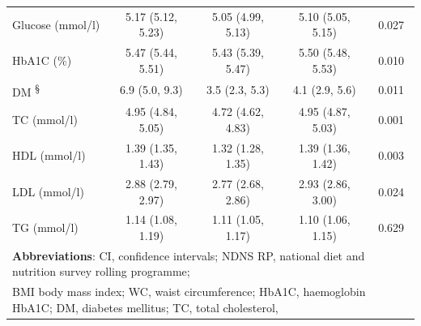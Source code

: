 \begin{table}[H]
\begin{tabular}[t]{lcccc}
		Glucose (mmol/l) & 5.17 (5.12, 5.23) & 5.05 (4.99, 5.13) & 5.10 (5.05, 5.15) & 0.027\\
		HbA1C (\%) & 5.47 (5.44, 5.51) & 5.43 (5.39, 5.47) & 5.50 (5.48, 5.53) & 0.010\\
		DM \textsuperscript{\S} & 6.9 (5.0, 9.3) & 3.5 (2.3, 5.3) & 4.1 (2.9, 5.6) & 0.011\\
		TC (mmol/l) & 4.95 (4.84, 5.05) & 4.72 (4.62, 4.83) & 4.95 (4.87, 5.03) & 0.001 \\
		HDL (mmol/l) & 1.39 (1.35, 1.43)& 1.32 (1.28, 1.35) & 1.39 (1.36, 1.42)& 0.003 \\ 
		LDL (mmol/l) &  2.88 (2.79, 2.97) & 2.77 (2.68, 2.86) & 2.93 (2.86, 3.00)& 0.024 \\ 
		TG (mmol/l) &  1.14 (1.08, 1.19) &  1.11 (1.05, 1.17) & 1.10 (1.06, 1.15) & 0.629\\
		\bottomrule
		\multicolumn{5}{l}{{\scriptsize \textbf{Abbreviations}: CI, confidence intervals; NDNS RP, national diet and nutrition survey rolling programme;}}\\
		\multicolumn{5}{l}{{\scriptsize BMI body mass index; WC, waist circumference; HbA1C, haemoglobin HbA1C; DM, diabetes mellitus; TC, total cholesterol, }}\\

\end{tabular}
\end{table}
